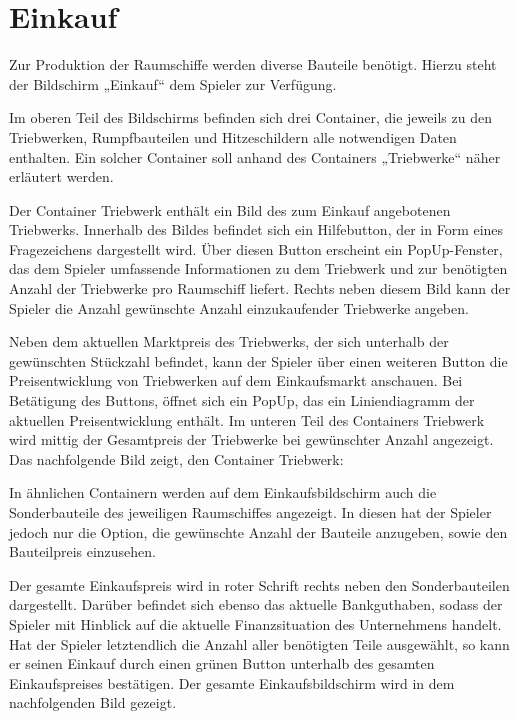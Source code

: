 \section{Einkauf}
\label{sec:ui-einkauf}

Zur Produktion der Raumschiffe werden diverse Bauteile benötigt. Hierzu steht der Bildschirm „Einkauf“ dem Spieler zur Verfügung.
 
Im oberen Teil des Bildschirms befinden sich drei Container, die jeweils zu den Triebwerken, Rumpfbauteilen und Hitzeschildern alle notwendigen Daten enthalten. Ein solcher Container soll anhand des Containers „Triebwerke“ näher erläutert werden. 
 
Der Container Triebwerk enthält ein Bild des zum Einkauf angebotenen Triebwerks. Innerhalb des Bildes befindet sich ein Hilfebutton, der in Form eines Fragezeichens dargestellt wird. Über diesen Button erscheint ein PopUp-Fenster, das dem Spieler umfassende Informationen zu dem Triebwerk und zur benötigten Anzahl der Triebwerke pro Raumschiff liefert. Rechts neben diesem Bild kann der Spieler die Anzahl gewünschte Anzahl einzukaufender Triebwerke angeben.
 
Neben dem aktuellen Marktpreis des  Triebwerks, der sich unterhalb der gewünschten Stückzahl befindet, kann der Spieler über einen weiteren Button die Preisentwicklung von Triebwerken auf dem Einkaufsmarkt anschauen. Bei Betätigung des Buttons, öffnet sich ein PopUp, das ein Liniendiagramm der aktuellen Preisentwicklung enthält. Im unteren Teil des Containers Triebwerk wird mittig der Gesamtpreis der Triebwerke bei gewünschter Anzahl angezeigt.  Das nachfolgende Bild zeigt, den Container Triebwerk:
 
 
In ähnlichen Containern werden auf dem Einkaufsbildschirm auch die Sonderbauteile des jeweiligen Raumschiffes angezeigt. In diesen hat der Spieler jedoch nur die Option, die gewünschte Anzahl der Bauteile anzugeben, sowie den Bauteilpreis einzusehen.
 
Der gesamte Einkaufspreis wird in roter Schrift rechts neben den Sonderbauteilen dargestellt. Darüber befindet sich ebenso das aktuelle Bankguthaben, sodass der Spieler mit Hinblick auf die aktuelle Finanzsituation des Unternehmens handelt. Hat der Spieler letztendlich die Anzahl aller benötigten Teile ausgewählt, so kann er seinen Einkauf durch einen grünen Button unterhalb des gesamten Einkaufspreises bestätigen. Der gesamte Einkaufsbildschirm wird in dem nachfolgenden Bild gezeigt. 

\autorende{}